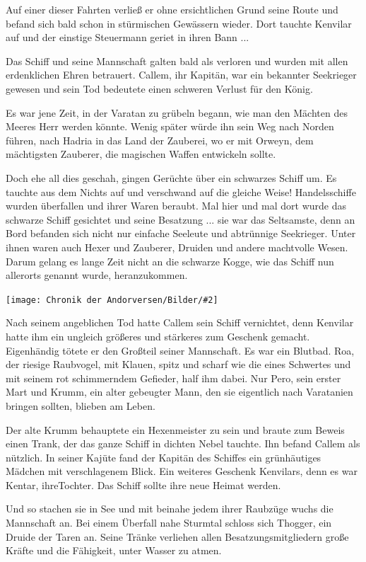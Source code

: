 \documentclass[10pt, a4paper, oneside]{book}
\newcommand{\bildmitts}[2][height=0.32\textwidth,width=0.48\textwidth,keepaspectratio]{%
    \begin{center}
        \texttt{[image: Chronik der Andorversen/Bilder/\#2]}
    \end{center}
}
\begin{document}
\begin{multicols}{2}
Auf einer dieser Fahrten verließ er ohne ersichtlichen Grund seine Route und befand sich bald schon in stürmischen Gewässern wieder. Dort tauchte Kenvilar auf und der einstige Steuermann geriet in ihren Bann ...\bigskip

Das Schiff und seine Mannschaft galten bald als verloren und wurden mit allen erdenklichen Ehren betrauert. Callem, ihr Kapitän, war ein bekannter Seekrieger gewesen und sein Tod bedeutete einen schweren Verlust für den König.\bigskip

Es war jene Zeit, in der Varatan zu grübeln begann, wie man den Mächten des Meeres Herr werden könnte. Wenig später würde ihn sein Weg nach Norden führen, nach Hadria in das Land der Zauberei, wo er mit Orweyn, dem mächtigsten Zauberer, die magischen Waffen entwickeln sollte.\bigskip

Doch ehe all dies geschah, gingen Gerüchte über ein schwarzes Schiff um. Es tauchte aus dem Nichts auf und verschwand auf die gleiche Weise! Handelsschiffe wurden überfallen und ihrer Waren beraubt. Mal hier und mal dort wurde das schwarze Schiff gesichtet und seine Besatzung ...  sie war das Seltsamste, denn an Bord befanden sich nicht nur einfache Seeleute und abtrünnige Seekrieger. Unter ihnen waren auch Hexer und Zauberer, Druiden und andere machtvolle Wesen. Darum gelang es lange Zeit nicht an die schwarze Kogge, wie das Schiff nun allerorts genannt wurde, heranzukommen.

\bildmitts{Varatans Fluch Bild 1.jpg}

Nach seinem angeblichen Tod hatte Callem sein Schiff vernichtet, denn Kenvilar hatte ihm ein ungleich größeres und stärkeres zum Geschenk gemacht. Eigenhändig tötete er den Großteil seiner Mannschaft. Es war ein Blutbad. Roa, der riesige Raubvogel, mit Klauen, spitz und scharf wie die eines Schwertes und mit seinem rot schimmerndem Gefieder, half ihm dabei. Nur Pero, sein erster Mart und Krumm, ein alter gebeugter Mann, den sie eigentlich nach Varatanien bringen sollten, blieben am Leben.\bigskip

Der alte Krumm behauptete ein Hexenmeister zu sein und braute zum Beweis einen Trank, der das ganze Schiff in dichten Nebel tauchte. Ihn befand Callem als nützlich. In seiner Kajüte fand der Kapitän des Schiffes ein grünhäutiges Mädchen mit verschlagenem Blick. Ein weiteres Geschenk Kenvilars, denn es war Kentar, ihreTochter. Das Schiff sollte ihre neue Heimat werden.

Und so stachen sie in See und mit beinahe jedem ihrer Raubzüge wuchs die Mannschaft an. Bei einem Überfall nahe Sturmtal schloss sich Thogger, ein Druide der Taren an. Seine Tränke verliehen allen Besatzungsmitgliedern große Kräfte und die Fähigkeit, unter Wasser zu atmen.\bigskip


\end{multicols}
\end{document}
